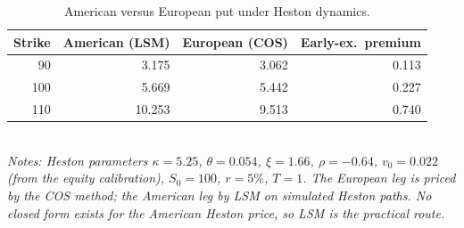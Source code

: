 \begin{table}[t]
\centering
\caption{American versus European put under Heston dynamics.}
\label{tab:hestonam}
\small
\begin{tabular}{rrrr}
\toprule
Strike & American (LSM) & European (COS) & Early-ex.\ premium \\
\midrule
90 & 3.175 & 3.062 & 0.113 \\
100 & 5.669 & 5.442 & 0.227 \\
110 & 10.253 & 9.513 & 0.740 \\
\bottomrule
\end{tabular}
\\[2pt]{\footnotesize\itshape Notes: Heston parameters $\kappa=5.25$, $\theta=0.054$, $\xi=1.66$, $\rho=-0.64$, $v_0=0.022$ (from the equity calibration), $S_0=100$, $r=5\%$, $T=1$. The European leg is priced by the COS method; the American leg by LSM on simulated Heston paths. No closed form exists for the American Heston price, so LSM is the practical route.}
\end{table}